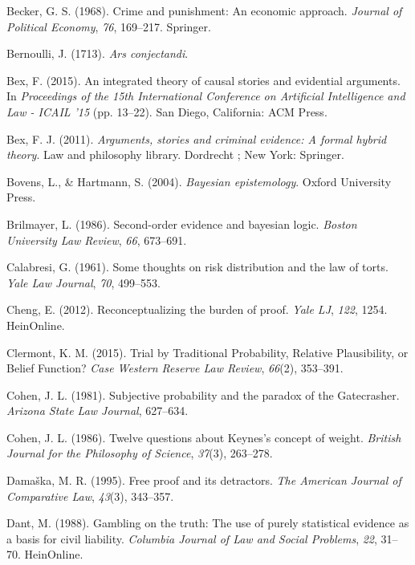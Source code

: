 \documentclass[11pt,dvipsnames,enabledeprecatedfontcommands]{scrartcl}
\begin{document}
\hypertarget{ref-becker1968crime}{}
Becker, G. S. (1968). Crime and punishment: An economic approach.
\emph{Journal of Political Economy}, \emph{76}, 169--217. Springer.

\hypertarget{ref-Bernoulli1713Ars-conjectandi}{}
Bernoulli, J. (1713). \emph{Ars conjectandi}.

\hypertarget{ref-bex2015IntegratedTheoryCausal}{}
Bex, F. (2015). An integrated theory of causal stories and evidential
arguments. In \emph{Proceedings of the 15th International Conference on
Artificial Intelligence and Law - ICAIL '15} (pp. 13--22). San Diego,
California: ACM Press.

\hypertarget{ref-bex2011ArgumentsStoriesCriminal}{}
Bex, F. J. (2011). \emph{Arguments, stories and criminal evidence: A
formal hybrid theory}. Law and philosophy library. Dordrecht ; New York:
Springer.

\hypertarget{ref-bovens2004bayesian}{}
Bovens, L., \& Hartmann, S. (2004). \emph{Bayesian epistemology}. Oxford
University Press.

\hypertarget{ref-brilmayer1986}{}
Brilmayer, L. (1986). Second-order evidence and bayesian logic.
\emph{Boston University Law Review}, \emph{66}, 673--691.

\hypertarget{ref-Calabresi1961}{}
Calabresi, G. (1961). Some thoughts on risk distribution and the law of
torts. \emph{Yale Law Journal}, \emph{70}, 499--553.

\hypertarget{ref-cheng2012reconceptualizing}{}
Cheng, E. (2012). Reconceptualizing the burden of proof. \emph{Yale LJ},
\emph{122}, 1254. HeinOnline.

\hypertarget{ref-clermont2015TrialTraditionalProbability}{}
Clermont, K. M. (2015). Trial by Traditional Probability, Relative
Plausibility, or Belief Function? \emph{Case Western Reserve Law
Review}, \emph{66}(2), 353--391.

\hypertarget{ref-Cohen81}{}
Cohen, J. L. (1981). Subjective probability and the paradox of the
Gatecrasher. \emph{Arizona State Law Journal}, 627--634.

\hypertarget{ref-cohen86}{}
Cohen, J. L. (1986). Twelve questions about Keynes's concept of weight.
\emph{British Journal for the Philosophy of Science}, \emph{37}(3),
263--278.

\hypertarget{ref-damaska1996free}{}
Damaška, M. R. (1995). Free proof and its detractors. \emph{The American
Journal of Comparative Law}, \emph{43}(3), 343--357.

\hypertarget{ref-dant1988gambling}{}
Dant, M. (1988). Gambling on the truth: The use of purely statistical
evidence as a basis for civil liability. \emph{Columbia Journal of Law
and Social Problems}, \emph{22}, 31--70. HeinOnline.
\end{document}

